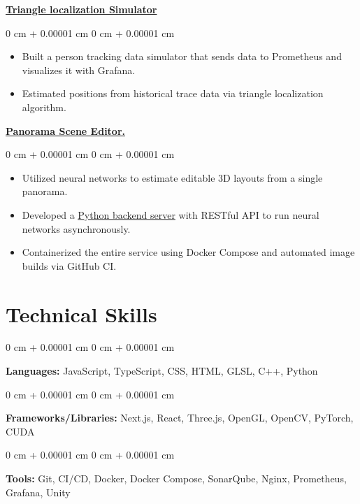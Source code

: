 \documentclass[10pt, letterpaper]{article}
\newenvironment{highlights}{
    \begin{itemize}[
        topsep=0.10 cm,
        parsep=0.10 cm,
        partopsep=0pt,
        itemsep=0pt,
        leftmargin=0 cm + 10pt
    ]
}{
    \end{itemize}
} %
\newenvironment{onecolentry}{
    \begin{adjustwidth}{
        0 cm + 0.00001 cm
    }{
        0 cm + 0.00001 cm
    }
}{
    \end{adjustwidth}
} %
\begin{document}
        \vspace{0.2 cm}

        \href{https://github.com/tsengyushiang/triangle-localization-simulator}{\textbf{Triangle localization Simulator}}
        \vspace{0.10 cm}
        \begin{onecolentry}
            \begin{highlights}
                \item Built a person tracking data simulator that sends data to Prometheus and visualizes it with Grafana.
                \item Estimated positions from historical trace data via triangle localization algorithm.
            \end{highlights}
        \end{onecolentry}

        \vspace{0.2 cm}

        \href{https://github.com/tsengyushiang/pano-to-mesh}{\textbf{Panorama Scene Editor.}}
        \vspace{0.10 cm}
        \begin{onecolentry}
            \begin{highlights}
                \item Utilized neural networks to estimate editable 3D layouts from a single panorama.
                \item Developed a \href{https://github.com/tsengyushiang/dula-net-server}{Python backend server} with RESTful API to run neural networks asynchronously.
                \item Containerized the entire service using Docker Compose and automated image builds via GitHub CI.
            \end{highlights}
        \end{onecolentry}
        

    \section{Technical Skills}

        \begin{onecolentry}
            \textbf{Languages:} JavaScript, TypeScript, CSS, HTML, GLSL, C++, Python
        \end{onecolentry}

        \vspace{0.2 cm}

        \begin{onecolentry}
            \textbf{Frameworks/Libraries:} Next.js, React, Three.js, OpenGL, OpenCV, PyTorch, CUDA
        \end{onecolentry}

        \vspace{0.2 cm}

        \begin{onecolentry}
            \textbf{Tools:} Git, CI/CD, Docker, Docker Compose, SonarQube, Nginx, Prometheus, Grafana, Unity
        \end{onecolentry}
\end{document}
